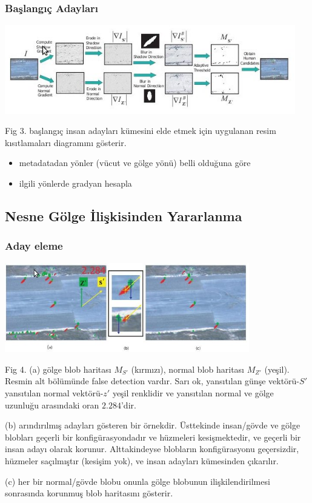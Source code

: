 \documentclass{beamer}
\begin{document}
\begin{frame}
	\frametitle{Başlangıç Adayları}

	\includegraphics[width=0.95\textwidth]{img/fig3.jpg}\label{fig:baslangic-adaylari}

	Fig 3. başlangıç insan adayları kümesini elde etmek için uygulanan resim
	kısıtlamaları diagramını gösterir.

	\begin{itemize}
		\item metadatadan yönler (vücut ve gölge yönü) belli olduğuna göre
		\item ilgili yönlerde gradyan hesapla
	\end{itemize}
\end{frame}

\subsection{Nesne Gölge İlişkisinden Yararlanma}

\begin{frame}[allowframebreaks]
	\frametitle{Aday eleme}

	\includegraphics[width=0.8\textwidth]{img/fig4.jpg}\label{fig:aday-eleme}

	\begin{scriptsize}
	Fig 4. (a) gölge blob haritası $M_{S'}$ (kırmızı), normal blob haritası
	$M_{Z'}$ (yeşil). Resmin alt bölümünde false detection vardır. Sarı ok,
	yansıtılan günşe vektörü-$S'$ yansıtılan normal vektörü-$z'$ yeşil
	renklidir ve yansıtılan normal ve gölge uzunluğu arasındaki oran
	$2.284$'dir.

	(b) arındırılmış adayları gösteren bir örnekdir. Üsttekinde insan/gövde ve
	gölge blobları geçerli bir konfigürasyondadır ve hüzmeleri kesişmektedir, ve
	geçerli bir insan adayı olarak korunur. Alttakindeyse blobların
	konfigürasyonu geçersizdir, hüzmeler saçılmıştır (kesişim yok), ve insan
	adayları kümesinden çıkarılır.

	(c) her bir normal/gövde blobu onunla gölge blobunun ilişkilendirilmesi
	sonrasında korunmuş blob haritasını gösterir.

	\end{scriptsize}
\end{frame}
\end{document}
